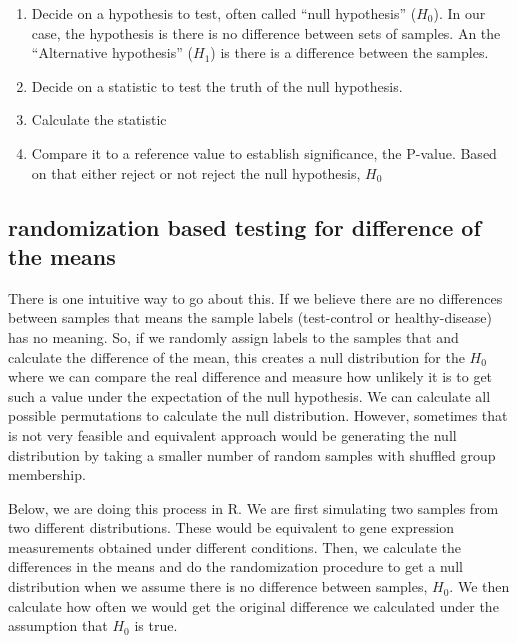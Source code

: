 \documentclass[12pt,]{krantz}
\providecommand{\tightlist}{%
  \setlength{\itemsep}{0pt}\setlength{\parskip}{0pt}}
\theoremstyle{definition}
\theoremstyle{definition}
\theoremstyle{definition}
\theoremstyle{remark}
\begin{document}
\begin{enumerate}
\def\labelenumi{\arabic{enumi}.}
\tightlist
\item
  Decide on a hypothesis to test, often called ``null hypothesis''
  (\(H_0\)). In our case, the hypothesis is there is no difference
  between sets of samples. An the ``Alternative hypothesis'' (\(H_1\))
  is there is a difference between the samples.
\item
  Decide on a statistic to test the truth of the null hypothesis.
\item
  Calculate the statistic
\item
  Compare it to a reference value to establish significance, the
  P-value. Based on that either reject or not reject the null
  hypothesis, \(H_0\)
\end{enumerate}

\hypertarget{randomization-based-testing-for-difference-of-the-means}{%
\subsection{randomization based testing for difference of the
means}\label{randomization-based-testing-for-difference-of-the-means}}

There is one intuitive way to go about this. If we believe there are no
differences between samples that means the sample labels (test-control
or healthy-disease) has no meaning. So, if we randomly assign labels to
the samples that and calculate the difference of the mean, this creates
a null distribution for the \(H_0\) where we can compare the real
difference and measure how unlikely it is to get such a value under the
expectation of the null hypothesis. We can calculate all possible
permutations to calculate the null distribution. However, sometimes that
is not very feasible and equivalent approach would be generating the
null distribution by taking a smaller number of random samples with
shuffled group membership.

Below, we are doing this process in R. We are first simulating two
samples from two different distributions. These would be equivalent to
gene expression measurements obtained under different conditions. Then,
we calculate the differences in the means and do the randomization
procedure to get a null distribution when we assume there is no
difference between samples, \(H_0\). We then calculate how often we
would get the original difference we calculated under the assumption
that \(H_0\) is true.
\end{document}
